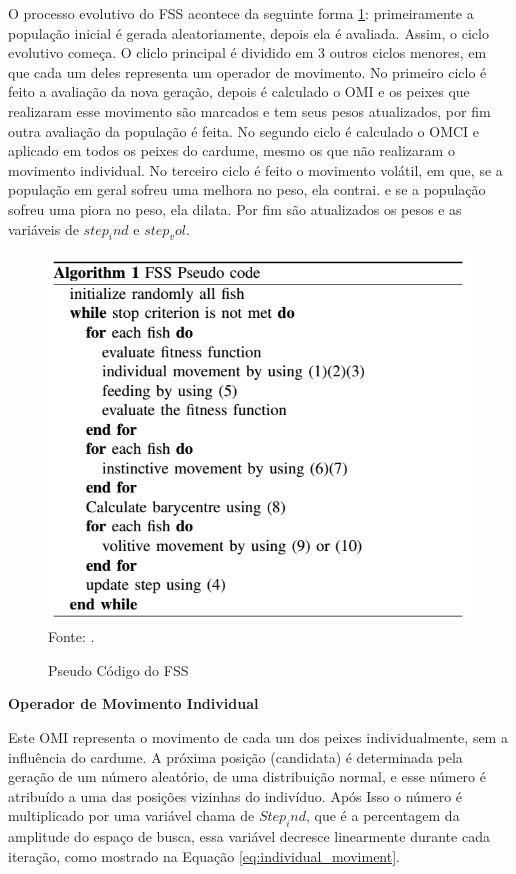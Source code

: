 O processo evolutivo do FSS acontece da seguinte forma \ref{fig:pseudo_code}: primeiramente a população inicial é gerada aleatoriamente, depois ela é avaliada. Assim, o ciclo evolutivo começa. O cliclo principal é dividido em 3 outros ciclos menores, em que cada um deles representa um operador de movimento. No primeiro ciclo é feito a avaliação da nova geração, depois é calculado o OMI e os peixes que realizaram esse movimento são marcados e tem seus pesos atualizados, por fim outra avaliação da população é feita. No segundo ciclo é calculado o OMCI e aplicado em todos os peixes do cardume, mesmo os que não realizaram o movimento individual. No terceiro ciclo é feito o movimento volátil, em que, se a população em geral sofreu uma melhora no peso, ela contrai. e se a população sofreu uma piora no peso, ela dilata. Por fim são atualizados os pesos e as variáveis de $step_ind$ e $step_vol$.

\begin{figure}[!htb]
	\caption{Pseudo Código do FSS}
	\centering
	\includegraphics[scale=0.5]{images/pseudo_codigo.png}
	\label{fig:pseudo_code}{\\Fonte: .}
\end{figure}

\noindent \textbf{Operador de Movimento Individual}

Este OMI representa o movimento de cada um dos peixes individualmente, sem a influência do cardume. A próxima posição (candidata) é determinada pela geração de um número aleatório, de uma distribuição normal, e esse número é atribuído a uma das posições vizinhas do indivíduo. Após Isso o número é multiplicado por uma variável chama de $Step_ind$, que é a percentagem da amplitude do espaço de busca, essa variável decresce linearmente durante cada iteração, como mostrado na Equação \ref{eq:individual_moviment}.

